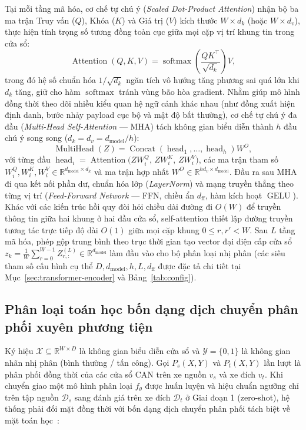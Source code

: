 \documentclass[12pt, a4paper, reqno, oneside]{book}
\begin{document}
Tại mỗi tầng mã hóa, cơ chế tự chú ý (\textit{Scaled Dot-Product Attention}) nhận bộ ba ma trận Truy vấn ($Q$), Khóa ($K$) và Giá trị ($V$) kích thước $W \times d_k$ (hoặc $W \times d_v$), thực hiện tính trọng số tương đồng toàn cục giữa mọi cặp vị trí khung tin trong cửa sổ:
\begin{equation}\label{eq:scaled-dot-attn}
\operatorname{Attention}(Q, K, V) = \operatorname{softmax}\!\left(\frac{QK^\top}{\sqrt{d_k}}\right)V,
\end{equation}
trong đó hệ số chuẩn hóa $1/\sqrt{d_k}$ ngăn tích vô hướng tăng phương sai quá lớn khi $d_k$ tăng, giữ cho hàm $\operatorname{softmax}$ tránh vùng bão hòa gradient. Nhằm giúp mô hình đồng thời theo dõi nhiều kiểu quan hệ ngữ cảnh khác nhau (như đồng xuất hiện định danh, bước nhảy payload cục bộ và mật độ bất thường), cơ chế tự chú ý đa đầu (\textit{Multi-Head Self-Attention} --- MHA) tách không gian biểu diễn thành $h$ đầu chú ý song song ($d_k = d_v = d_{\text{model}}/h$):
\begin{equation}\label{eq:mha}
\operatorname{MultiHead}(Z) = \operatorname{Concat}(\operatorname{head}_1, \ldots, \operatorname{head}_h) W^O,
\end{equation}
với từng đầu $\operatorname{head}_i = \operatorname{Attention}\!\big(Z W_i^Q,\, Z W_i^K,\, Z W_i^V\big)$, các ma trận tham số $W_i^Q, W_i^K, W_i^V \in \mathbb{R}^{d_{\text{model}} \times d_k}$ và ma trận hợp nhất $W^O \in \mathbb{R}^{h d_v \times d_{\text{model}}}$. Đầu ra sau MHA đi qua kết nối phần dư, chuẩn hóa lớp (\textit{LayerNorm}) và mạng truyền thẳng theo từng vị trí (\textit{Feed-Forward Network} --- FFN, chiều ẩn $d_{\text{ff}}$, hàm kích hoạt $\operatorname{GELU}$). Khác với các kiến trúc hồi quy đòi hỏi chiều dài đường đi $O(W)$ để truyền thông tin giữa hai khung ở hai đầu cửa sổ, self-attention thiết lập đường truyền tương tác trực tiếp độ dài $O(1)$ giữa mọi cặp khung $0 \le r, r' < W$. Sau $L$ tầng mã hóa, phép gộp trung bình theo trục thời gian tạo vector đại diện cấp cửa sổ $z_k = \frac{1}{W}\sum_{r=0}^{W-1} Z^{(L)}_{r,:} \in \mathbb{R}^{d_{\text{model}}}$ làm đầu vào cho bộ phân loại nhị phân (các siêu tham số cấu hình cụ thể $D, d_{\text{model}}, h, L, d_{\text{ff}}$ được đặc tả chi tiết tại Mục~\ref{sec:transformer-encoder} và Bảng~\ref{tab:config}).

\subsection{Phân loại toán học bốn dạng dịch chuyển phân phối xuyên phương tiện}\label{subsec:domain-shifts}
Ký hiệu $\mathcal{X} \subseteq \mathbb{R}^{W \times D}$ là không gian biểu diễn cửa sổ và $\mathcal{Y} = \{0, 1\}$ là không gian nhãn nhị phân (bình thường / tấn công). Gọi $P_s(X, Y)$ và $P_t(X, Y)$ lần lượt là phân phối đồng thời của các cửa sổ CAN trên xe nguồn $v_s$ và xe đích $v_t$. Khi chuyển giao một mô hình phân loại $f_\theta$ được huấn luyện và hiệu chuẩn ngưỡng chỉ trên tập nguồn $\mathcal{D}_s$ sang đánh giá trên xe đích $\mathcal{D}_t$ ở Giai đoạn 1 (zero-shot), hệ thống phải đối mặt đồng thời với bốn dạng dịch chuyển phân phối tách biệt về mặt toán học~\cite{shimodaira2000covariate,quinonerocandela2009dataset,morenotorres2012shift,zhao2019invariant}:
\end{document}
